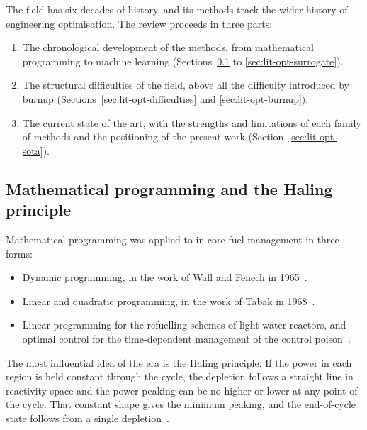 The field has six decades of history, and its methods track the wider
history of engineering optimisation. The review proceeds in three
parts:

\begin{enumerate}
  \item The chronological development of the methods, from mathematical
        programming to machine learning
        (Sections~\ref{sec:lit-opt-early} to
        \ref{sec:lit-opt-surrogate}).

  \item The structural difficulties of the field, above all the
        difficulty introduced by burnup
        (Sections~\ref{sec:lit-opt-difficulties}
        and \ref{sec:lit-opt-burnup}).

  \item The current state of the art, with the strengths and
        limitations of each family of methods and the positioning of
        the present work (Section~\ref{sec:lit-opt-sota}).
\end{enumerate}

\subsection{Mathematical programming and the Haling principle}
\label{sec:lit-opt-early}

Mathematical programming was applied to in-core fuel management in
three forms:

\begin{itemize}
  \item Dynamic programming, in the work of Wall and Fenech in
        1965~\cite{meneses_2010}.

  \item Linear and quadratic programming, in the work of Tabak in
        1968~\cite{meneses_2010}.

  \item Linear programming for the refuelling schemes of light water
        reactors, and optimal control for the time-dependent management
        of the control poison~\cite{downar_1988}.
\end{itemize}

The most influential idea of the era is the Haling principle. If the
power in each region is held constant through the cycle, the depletion
follows a straight line in reactivity space and the power peaking can be
no higher or lower at any point of the cycle. That constant shape gives
the minimum peaking, and the end-of-cycle state follows from a single
depletion~\cite{downar_1988}.

